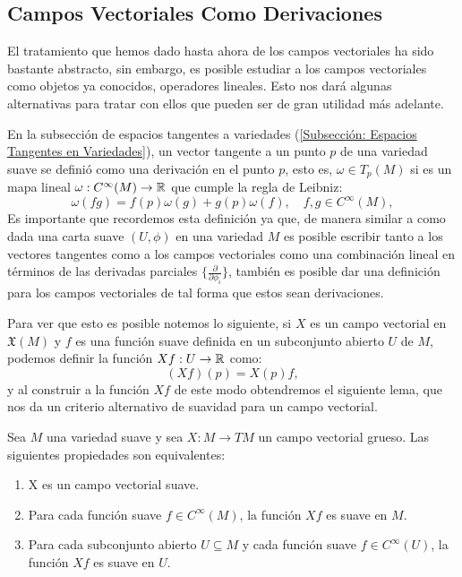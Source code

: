 \subsection{Campos Vectoriales Como Derivaciones}\label{Subsección: Campos Vectoriales Como Derivaciones}
El tratamiento que hemos dado hasta ahora de los campos vectoriales ha sido bastante abstracto, sin embargo, es posible estudiar a los campos vectoriales como objetos ya conocidos, operadores lineales. Esto nos dará algunas alternativas para tratar con ellos que pueden ser de gran utilidad más adelante.

En la subsección de espacios tangentes a variedades (\ref{Subsección: Espacios Tangentes en Variedades}), un vector tangente a un punto $p$ de una variedad suave se definió como una derivación en el punto $p$, esto es, $\omega \in T_p(M)$ si es un mapa lineal $\omega: C^{\infty}(M) \to \mathbb{R}$ que cumple la regla de Leibniz:
\[
	\omega(fg) = f(p)\omega(g) + g(p) \omega(f), \quad f,g \in C^{\infty}(M),
\]
Es importante que recordemos esta definición ya que, de manera similar a como dada una carta suave $(U,\phi)$ en una variedad $M$ es posible escribir tanto a los vectores tangentes como a los campos vectoriales como una combinación lineal en términos de las derivadas parciales $\{\frac{\partial}{\partial \phi_i}\}$, también es posible dar una definición para los campos vectoriales de tal forma que estos sean derivaciones.

Para ver que esto es posible notemos lo siguiente, si $X$ es un campo vectorial en $\mathfrak{X}(M)$ y $f$ es una función suave definida en un subconjunto abierto $U$ de $M$, podemos definir la función $Xf: U \to \mathbb{R}$ como:
\[
	(Xf)(p) = X(p)f,
\]
y al construir a la función $Xf$ de este modo obtendremos el siguiente lema, que nos da un criterio alternativo de suavidad para un campo vectorial.

\begin{lemma}
	Sea $M$ una variedad suave y sea $X:M \to TM$ un campo vectorial grueso. Las siguientes propiedades son equivalentes:
	\begin{enumerate}
		\item X es un campo vectorial suave.
		\item Para cada función suave $f \in C^{\infty}(M)$, la función $Xf$ es suave en $M$.
		\item Para cada subconjunto abierto $U \subseteq M$ y cada función suave $f \in C^{\infty}(U)$, la función $Xf$ es suave en $U$.
	\end{enumerate}
\end{lemma}

